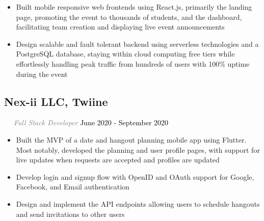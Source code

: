 \documentclass{article}
\newcommand{\resumesection}[3]{
    \subsection*{#1}
    \ 
    \ 
    \small
    \textcolor{grey}{\emph{#2}}
    \normalsize
    \hfill
    \textcolor{black}{#3}
    \normalsize
}
\begin{document}
\begin{itemize}
    \item Built mobile responsive web frontends using React.js, primarily the landing page, promoting the event to thousands of students, and the dashboard, facilitating team creation and displaying live event announcements
    \item Design scalable and fault tolerant backend using serverless technologies and a PostgreSQL database, staying within cloud computing free tiers while effortlessly handling peak traffic from hundreds of users with 100\% uptime during the event
\end{itemize}
\resumesection{Nex-ii LLC, Twiine}{Full Stack Developer}{June 2020 - September 2020}
\begin{itemize}
    \item Built the MVP of a date and hangout planning mobile app using Flutter. Most notably, developed the planning and user profile pages, with support for live updates when requests are accepted and profiles are updated
    \item Develop login and signup flow with OpenID and OAuth support for Google, Facebook, and Email authentication
    \item Design and implement the API endpoints allowing users to schedule hangouts and send invitations to other users
\end{itemize}
\end{document}
